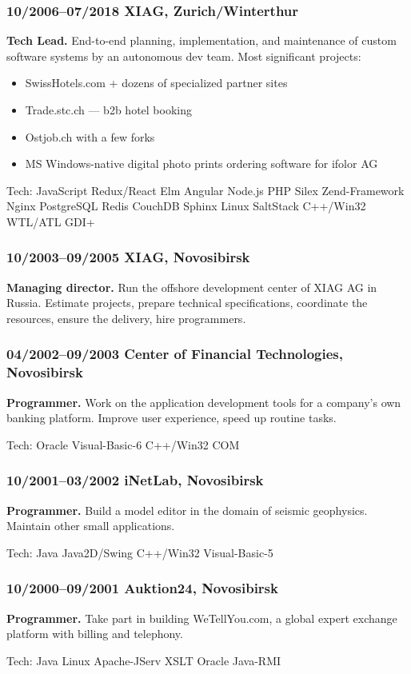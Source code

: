 \documentclass[a4paper, twocolumn, 10pt]{article}
\begin{document}
\subsubsection*{10/2006--07/2018 XIAG, Zurich/Winterthur}

\textbf{Tech Lead.} End-to-end planning, implementation, and maintenance of custom
software systems by an autonomous dev team. Most significant projects:

\begin{itemize}
  \itemsep0em
  \item SwissHotels.com + dozens of specialized partner sites
  \item Trade.stc.ch — b2b hotel booking
  \item Ostjob.ch with a few forks
  \item MS Windows-native digital photo prints ordering software for ifolor AG
\end{itemize}

Tech: JavaScript Redux/React Elm Angular Node.js PHP Silex Zend-Framework Nginx PostgreSQL
Redis CouchDB Sphinx Linux SaltStack C++/Win32 WTL/ATL GDI+

\subsubsection*{10/2003--09/2005 XIAG, Novosibirsk}

\textbf{Managing director.} Run the offshore development center of XIAG AG in
Russia. Estimate projects, prepare technical specifications, coordinate the resources, ensure the
delivery, hire programmers.

\subsubsection*{04/2002--09/2003 Center of Financial Technologies, Novosibirsk}

\textbf{Programmer.} Work on the application development tools for a company's own banking
platform. Improve user experience, speed up routine tasks.

Tech: Oracle Visual-Basic-6 C++/Win32 COM

\subsubsection*{10/2001--03/2002 iNetLab, Novosibirsk}

\textbf{Programmer.} Build a model editor in the domain of seismic geophysics. Maintain other small
applications.

Tech: Java Java2D/Swing C++/Win32 Visual-Basic-5

\subsubsection*{10/2000--09/2001 Auktion24, Novosibirsk}

\textbf{Programmer.} Take part in building WeTellYou.com, a global expert exchange platform with
billing and telephony.

Tech: Java Linux Apache-JServ XSLT Oracle Java-RMI
\end{document}
